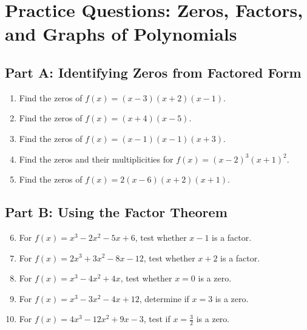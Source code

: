 \documentclass[12pt]{article}
\begin{document}
\newpage


\section*{Practice Questions: Zeros, Factors, and Graphs of Polynomials}

\subsection*{Part A: Identifying Zeros from Factored Form}
\begin{enumerate}
  \item Find the zeros of \(f(x) = (x - 3)(x + 2)(x - 1)\).
  \item Find the zeros of \(f(x) = (x + 4)(x - 5)\).
  \item Find the zeros of \(f(x) = (x - 1)(x - 1)(x + 3)\).
  \item Find the zeros and their multiplicities for \(f(x) = (x - 2)^3(x + 1)^2\).
  \item Find the zeros of \(f(x) = 2(x - 6)(x + 2)(x + 1)\).
\end{enumerate}

\subsection*{Part B: Using the Factor Theorem}
\begin{enumerate}
  \setcounter{enumi}{5}
  \item For \(f(x) = x^3 - 2x^2 - 5x + 6\), test whether \(x - 1\) is a factor.
  \item For \(f(x) = 2x^3 + 3x^2 - 8x - 12\), test whether \(x + 2\) is a factor.
  \item For \(f(x) = x^3 - 4x^2 + 4x\), test whether \(x = 0\) is a zero.
  \item For \(f(x) = x^3 - 3x^2 - 4x + 12\), determine if \(x = 3\) is a zero.
  \item For \(f(x) = 4x^3 - 12x^2 + 9x - 3\), test if \(x = \tfrac{3}{2}\) is a zero.
\end{enumerate}
\end{document}
